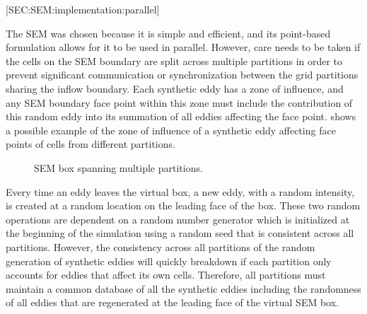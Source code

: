 
[SEC:SEM:implementation:parallel]

The SEM was chosen because it is simple and efficient, and its point-based
formulation allows for it to be used in parallel.
%
However, care needs to be taken if the cells on the SEM boundary are split
across multiple partitions in order to prevent significant communication or
synchronization between the grid partitions sharing the inflow boundary.
%
Each synthetic eddy has a zone of influence, and any SEM boundary face point
within this zone must include the contribution of this random eddy into its
summation of all eddies affecting the face point.
%
 shows a possible example of the zone of influence of
a synthetic eddy affecting face points of cells from different partitions.
%
\begin{figure}[tb]
  \centering
  \caption{SEM box spanning multiple partitions.}
  \label{FIG:SEM:ParallelSEM}
\end{figure}


Every time an eddy leaves the virtual box, a new eddy, with a random intensity,
is created at a random location on the leading face of the box.
%
These two random operations are dependent on a random number generator which is
initialized at the beginning of the simulation using a random seed that is
consistent across all partitions.
%
However, the consistency across all partitions of the random generation of
synthetic eddies will quickly breakdown if each partition only accounts for
eddies that affect its own cells.
%
Therefore, all partitions must maintain a common database of all the synthetic
eddies including the randomness of all eddies that are regenerated at the
leading face of the virtual SEM box.


